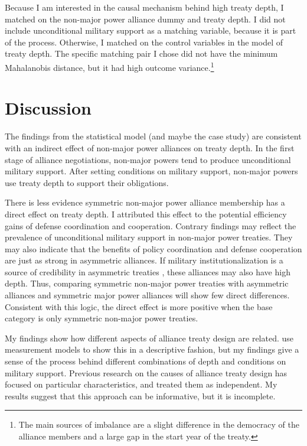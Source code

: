 \documentclass[12pt]{article}
\begin{document}
Because I am interested in the causal mechanism behind high treaty depth, I matched on the non-major power alliance dummy and treaty depth. 
I did not include unconditional military support as a matching variable, because it is part of the process. 
Otherwise, I matched on the control variables in the model of treaty depth. 
The specific matching pair I chose did not have the minimum Mahalanobis distance, but it had high outcome variance.\footnote{The main sources of imbalance are a slight difference in the democracy of the alliance members and a large gap in the start year of the treaty.} 


\section{Discussion}


The findings from the statistical model (and maybe the case study) are consistent with an indirect effect of non-major power alliances on treaty depth. 
In the first stage of alliance negotiations, non-major powers tend to produce unconditional military support. 
After setting conditions on military support, non-major powers use treaty depth to support their obligations. 


There is less evidence symmetric non-major power alliance membership has a direct effect on treaty depth.
I attributed this effect to the potential efficiency gains of defense coordination and cooperation.  
Contrary findings may reflect the prevalence of unconditional military support in non-major power treaties. 
They may also indicate that the benefits of policy coordination and defense cooperation are just as strong in asymmetric alliances. 
If military institutionalization is a source of credibility in asymmetric treaties \citep{Mattes2012}, these alliances may also have high depth. 
Thus, comparing symmetric non-major power treaties with asymmetric alliances and symmetric major power alliances will show few direct differences.
Consistent with this logic, the direct effect is more positive when the base category is only symmetric non-major power treaties.  

My findings show how different aspects of alliance treaty design are related. 
\citet{BensonClinton2016} use measurement models to show this in a descriptive fashion, but my findings give a sense of the process behind different combinations of depth and conditions on military support. 
Previous research on the causes of alliance treaty design \citep{Benson2012, Mattes2012, Chibaetal2015} has focused on particular characteristics, and treated them as independent. 
My results suggest that this approach can be informative, but it is incomplete. 
\end{document}
